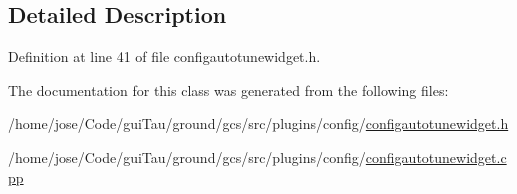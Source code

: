 \subsection{Detailed Description}


Definition at line 41 of file configautotunewidget.\-h.



The documentation for this class was generated from the following files\-:\begin{DoxyCompactItemize}
\item 
/home/jose/\-Code/gui\-Tau/ground/gcs/src/plugins/config/\hyperlink{configautotunewidget_8h}{configautotunewidget.\-h}\item 
/home/jose/\-Code/gui\-Tau/ground/gcs/src/plugins/config/\hyperlink{configautotunewidget_8cpp}{configautotunewidget.\-cpp}\end{DoxyCompactItemize}
